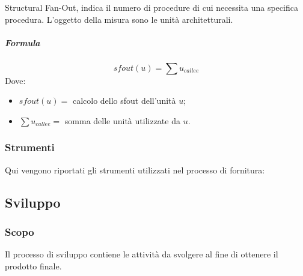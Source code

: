         Structural Fan-Out, indica il numero di procedure di cui necessita una 
        specifica procedura. L'oggetto della misura sono le unità architetturali. 
        \subparagraph{Formula}
        \begin{displaymath}
          sfout(u) = \sum u_{callee}
        \end{displaymath}
        Dove:
        \begin{itemize}
          \item[] $sfout(u) =$ calcolo dello sfout dell'unità $u$;
          \item[] $\sum u_{callee} =$ somma delle unità utilizzate da $u$.
        \end{itemize}
			\subsubsection{Strumenti}
			Qui vengono riportati gli strumenti utilizzati nel processo di fornitura:
			
		\subsection{Sviluppo}
		\subsubsection{Scopo}
		Il processo di sviluppo contiene le attività da svolgere al fine di ottenere il prodotto finale.
